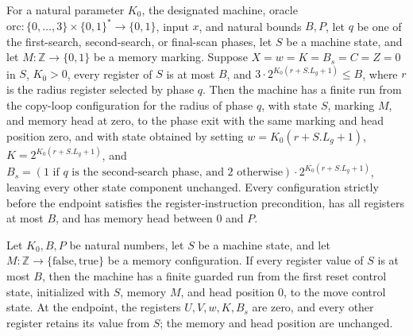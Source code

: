\begin{theorem}
\label{Complexity.LogProg.ExpBFS.wk_run}
\leanok
{}
For a natural parameter $K_0$, the designated machine, oracle
$\mathrm{orc}:\{0,\ldots,3\}\times\{0,1\}^*\to\{0,1\}$, input $x$, and natural bounds
$B,P$, let $q$ be one of the first-search, second-search, or final-scan phases, let $S$
be a machine state, and let $M:\mathbb Z\to\{0,1\}$ be a memory marking. Suppose
$X=w=K=B_s=C=Z=0$ in $S$, $K_0>0$, every register of $S$ is at most $B$, and $3\cdot
2^{K_0(r+S.L_g+1)}\le B$, where $r$ is the radius register selected by phase $q$. Then
the machine has a finite run from the copy-loop configuration for the radius of phase
$q$, with state $S$, marking $M$, and memory head at zero, to the phase exit with the
same marking and head position zero, and with state obtained by setting
$w=K_0(r+S.L_g+1)$, $K=2^{K_0(r+S.L_g+1)}$, and $B_s=(1\text{ if }q\text{ is the
second-search phase, and }2\text{ otherwise})\cdot 2^{K_0(r+S.L_g+1)}$, leaving every
other state component unchanged. Every configuration strictly before the endpoint
satisfies the register-instruction precondition, has all registers at most $B$, and has
memory head between $0$ and $P$.
\end{theorem}

\begin{theorem}
\label{Complexity.LogProg.ExpBFS.d1_run}
\leanok
{}
Let $K_0,B,P$ be natural numbers, let $S$ be a machine state, and let
$M\colon\mathbb{Z}\to\{\mathrm{false},\mathrm{true}\}$ be a memory configuration. If
every register value of $S$ is at most $B$, then the machine has a finite guarded run
from the first reset control state, initialized with $S$, memory $M$, and head position
$0$, to the move control state. At the endpoint, the registers $U,V,w,K,B_s$ are zero,
and every other register retains its value from $S$; the memory and head position are
unchanged.
\end{theorem}

